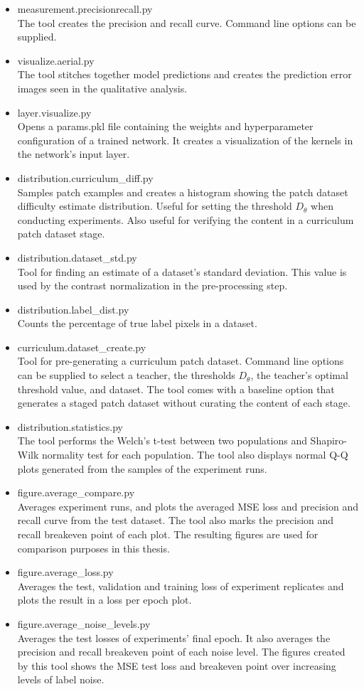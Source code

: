 \begin{itemize}
\item measurement.precisionrecall.py\\
The tool creates the precision and recall curve. Command line options can be supplied.
\item visualize.aerial.py\\
The tool stitches together model predictions and creates the prediction error images seen in the qualitative analysis.
\item layer.visualize.py\\
Opens a params.pkl file containing the weights and hyperparameter configuration of a trained network. It creates a visualization of the kernels in the network's input layer.
\item distribution.curriculum\_diff.py\\
Samples patch examples and creates a histogram showing the patch dataset difficulty estimate distribution. Useful for setting the  threshold $D_\theta$ when conducting experiments. Also useful for verifying the content in a curriculum patch dataset stage.
\item distribution.dataset\_std.py\\
Tool for finding an estimate of a dataset's standard deviation. This value is used by the contrast normalization in the pre-processing step.
\item distribution.label\_dist.py\\
Counts the percentage of true label pixels in a dataset.
\item curriculum.dataset\_create.py\\
Tool for pre-generating a curriculum patch dataset. Command line options can be supplied to select a teacher, the thresholds $D_\theta$, the teacher's optimal threshold value, and dataset. The tool comes with a baseline option that generates a staged patch dataset without curating the content of each stage.
\item distribution.statistics.py\\
The tool performs the Welch's t-test between two populations and Shapiro-Wilk normality test for each population. The tool also displays normal Q-Q plots generated from the samples of the experiment runs. 
\item figure.average\_compare.py\\
Averages experiment runs, and plots the averaged MSE loss and precision and recall curve from the test dataset. The tool also marks the precision and recall breakeven point of each plot. The resulting figures are used for comparison purposes in this thesis.
\item figure.average\_loss.py\\
Averages the test, validation and training loss of experiment replicates and plots the result in a loss per epoch plot. 
\item figure.average\_noise\_levels.py\\
Averages the test losses of experiments' final epoch. It also averages the precision and recall breakeven point of each noise level. The figures created by this tool shows the MSE test loss and breakeven point over increasing levels of label noise.
\end{itemize}

